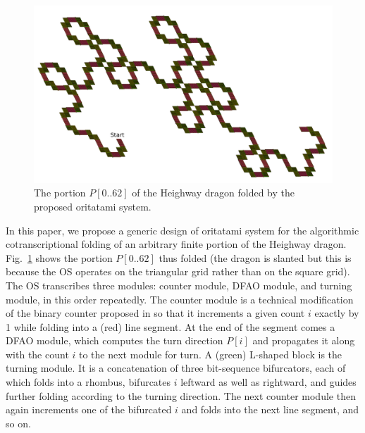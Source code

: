 \documentclass[dvipdfmx,review]{elsarticle}
\begin{document}
\begin{figure}[h]

\centering
\includegraphics[width=\linewidth]{Figs/6bit_heighway.pdf}
\caption{The portion $P[0 .. 62]$ of the Heighway dragon folded by the proposed oritatami system.}
\label{fig:heighway6_oritatami}

\end{figure}

In this paper, we propose a generic design of oritatami system for the algorithmic cotranscriptional folding of an arbitrary finite portion of the Heighway dragon. 
Fig.~\ref{fig:heighway6_oritatami} shows the portion $P[0 .. 62]$ thus folded (the dragon is slanted but this is because the OS operates on the triangular grid rather than on the square grid). 
The OS transcribes three modules: counter module, DFAO module, and turning module, in this order repeatedly. 
The counter module is a technical modification of the binary counter proposed in \cite{GeMeScSe2016} so that it increments a given count $i$ exactly by 1 while folding into a (red) line segment. 
At the end of the segment comes a DFAO module, which computes the turn direction $P[i]$ and propagates it along with the count $i$ to the next module for turn.  
A (green) L-shaped block is the turning module. 
It is a concatenation of three bit-sequence bifurcators, each of which folds into a rhombus, bifurcates $i$ leftward as well as rightward, and guides further folding according to the turning direction. 
The next counter module then again increments one of the bifurcated $i$ and folds into the next line segment, and so on. 
\end{document}

